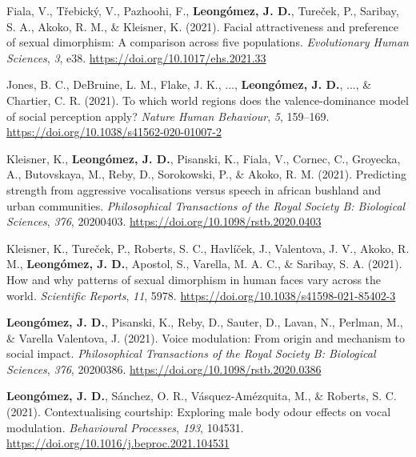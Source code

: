 \documentclass[11pt,a4paper,]{awesome-cv}
\begin{document}
\leavevmode{}%
Fiala, V., Třebický, V., Pazhoohi, F., \textbf{Leongómez, J. D.},
Tureček, P., Saribay, S. A., Akoko, R. M., \& Kleisner, K. (2021).
Facial attractiveness and preference of sexual dimorphism: A comparison
across five populations. \emph{Evolutionary Human Sciences}, \emph{3},
e38. \url{https://doi.org/10.1017/ehs.2021.33}

\leavevmode{}%
Jones, B. C., DeBruine, L. M., Flake, J. K., ...,
\textbf{Leongómez, J. D.}, ..., \& Chartier, C. R. (2021). {To which
world regions does the valence-dominance model of social perception
apply?} \emph{Nature Human Behaviour}, \emph{5}, 159--169.
\url{https://doi.org/10.1038/s41562-020-01007-2}

\leavevmode{}%
Kleisner, K., \textbf{Leongómez, J. D.}, Pisanski, K., Fiala, V.,
Cornec, C., Groyecka, A., Butovskaya, M., Reby, D., Sorokowski, P., \&
Akoko, R. M. (2021). Predicting strength from aggressive vocalisations
versus speech in african bushland and urban communities.
\emph{Philosophical Transactions of the Royal Society B: Biological
Sciences}, \emph{376}, 20200403.
\url{https://doi.org/10.1098/rstb.2020.0403}

\leavevmode{}%
Kleisner, K., Tureček, P., Roberts, S. C., Havlíček, J., Valentova, J.
V., Akoko, R. M., \textbf{Leongómez, J. D.}, Apostol, S., Varella, M. A.
C., \& Saribay, S. A. (2021). How and why patterns of sexual dimorphism
in human faces vary across the world. \emph{Scientific Reports},
\emph{11}, 5978. \url{https://doi.org/10.1038/s41598-021-85402-3}

\leavevmode{}%
\textbf{Leongómez, J. D.}, Pisanski, K., Reby, D., Sauter, D., Lavan,
N., Perlman, M., \& Varella Valentova, J. (2021). Voice modulation:
{From} origin and mechanism to social impact. \emph{Philosophical
Transactions of the Royal Society B: Biological Sciences}, \emph{376},
20200386. \url{https://doi.org/10.1098/rstb.2020.0386}

\leavevmode{}%
\textbf{Leongómez, J. D.}, Sánchez, O. R., Vásquez-Amézquita, M., \&
Roberts, S. C. (2021). Contextualising courtship: Exploring male body
odour effects on vocal modulation. \emph{Behavioural Processes},
\emph{193}, 104531. \url{https://doi.org/10.1016/j.beproc.2021.104531}
\end{document}
